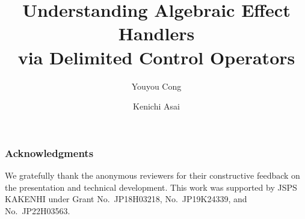 \documentclass[runningheads]{llncs}
\begin{document}
\title{Understanding Algebraic Effect Handlers \\ via Delimited Control Operators}

\author{Youyou Cong \and
Kenichi Asai}



\maketitle

\begin{abstract}


\end{abstract}

















\subsubsection*{Acknowledgments}
We gratefully thank the anonymous reviewers for their constructive feedback 
on the presentation and technical development.
This work was supported by JSPS KAKENHI under Grant No.~JP18H03218, 
No.~JP19K24339, and No.~JP22H03563.






%
\end{document}
